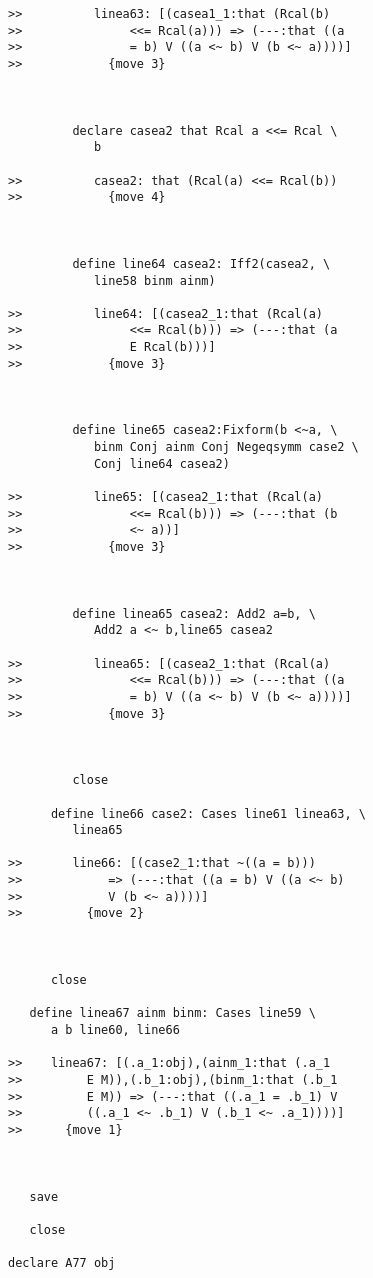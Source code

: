 \documentclass[12pt]{article}
\begin{document}
\begin{verbatim}
>>          linea63: [(casea1_1:that (Rcal(b)
>>               <<= Rcal(a))) => (---:that ((a
>>               = b) V ((a <~ b) V (b <~ a))))]
>>            {move 3}



         declare casea2 that Rcal a <<= Rcal \
            b

>>          casea2: that (Rcal(a) <<= Rcal(b))
>>            {move 4}



         define line64 casea2: Iff2(casea2, \
            line58 binm ainm)

>>          line64: [(casea2_1:that (Rcal(a)
>>               <<= Rcal(b))) => (---:that (a
>>               E Rcal(b)))]
>>            {move 3}



         define line65 casea2:Fixform(b <~a, \
            binm Conj ainm Conj Negeqsymm case2 \
            Conj line64 casea2)

>>          line65: [(casea2_1:that (Rcal(a)
>>               <<= Rcal(b))) => (---:that (b
>>               <~ a))]
>>            {move 3}



         define linea65 casea2: Add2 a=b, \
            Add2 a <~ b,line65 casea2

>>          linea65: [(casea2_1:that (Rcal(a)
>>               <<= Rcal(b))) => (---:that ((a
>>               = b) V ((a <~ b) V (b <~ a))))]
>>            {move 3}



         close

      define line66 case2: Cases line61 linea63, \
         linea65

>>       line66: [(case2_1:that ~((a = b)))
>>            => (---:that ((a = b) V ((a <~ b)
>>            V (b <~ a))))]
>>         {move 2}



      close

   define linea67 ainm binm: Cases line59 \
      a b line60, line66

>>    linea67: [(.a_1:obj),(ainm_1:that (.a_1
>>         E M)),(.b_1:obj),(binm_1:that (.b_1
>>         E M)) => (---:that ((.a_1 = .b_1) V
>>         ((.a_1 <~ .b_1) V (.b_1 <~ .a_1))))]
>>      {move 1}



   save

   close

declare A77 obj


\end{verbatim}
\end{document}
